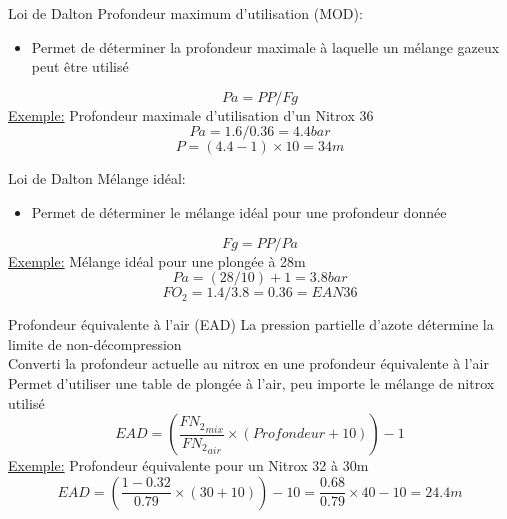 \begin{frame}{Loi de Dalton}
	Profondeur maximum d'utilisation (MOD):
	\begin{itemize}
		\item Permet de déterminer la profondeur maximale à laquelle un mélange gazeux peut être utilisé
	\end{itemize}
	\[ \boxed{Pa = PP / Fg} \]
	\vfill
	\underline{Exemple:}	Profondeur maximale d'utilisation d'un Nitrox 36\\
	\[ Pa = 1.6 / 0.36 = 4.4 bar \]
	\[ P = (4.4 - 1) \times 10 = 34m \]	
\end{frame}

\begin{frame}{Loi de Dalton}
	Mélange idéal:
	\begin{itemize}
		\item Permet de déterminer le mélange idéal pour une profondeur donnée
	\end{itemize}
	 \[ \boxed{Fg = PP / Pa} \]
	\vfill
	\underline{Exemple:}	Mélange idéal pour une plongée à 28m\\
	\[	Pa = (28 / 10)+1 = 3.8 bar\]
	\[ FO_2 = 1.4 / 3.8 = 0.36 = EAN36 \]
\end{frame}

\begin{frame}{Profondeur équivalente à l'air (EAD)}
	La pression partielle d'azote détermine la limite de non-décompression\\
	Converti la profondeur actuelle au nitrox en une profondeur équivalente à l'air\\
	Permet d'utiliser une table de plongée à l'air, peu importe le mélange de nitrox utilisé\\

	\[	EAD = \left( \dfrac{ {FN_2}_{mix} }{ {FN_2}_{air} } \times (Profondeur+10) \right) -1 \]
	\vfill
	\underline{Exemple:} Profondeur équivalente pour un Nitrox 32 à 30m\\

	\[	EAD = \left( \dfrac{1-0.32}{0.79} \times (30+10) \right) -10 = \dfrac{0.68}{0.79} \times 40 - 10 = 24.4m \]
\end{frame}
